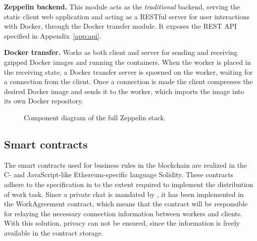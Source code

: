 \textbf{Zeppelin backend.} This module acts as the \textit{traditional} backend, serving the static client web application and acting as a RESTful server for user interactions with Docker, through the Docker transfer module. It exposes the REST API specified in Appendix~\ref{app:api}.

\textbf{Docker transfer.} Works as both client and server for sending and receiving gzipped Docker images and running the containers. When the worker is placed in the receiving state, a Docker transfer server is spawned on the worker, waiting for a connection from the client. Once a connection is made the client compresses the desired Docker image and sends it to the worker, which imports the image into its own Docker repository.

\begin{figure}[ht]
\centering
{}
\caption{Component diagram of the full Zeppelin stack.}
\label{zep-stack}
\end{figure}

\subsection{Smart contracts}
The smart contracts used for business rules in the blockchain are realized in the C- and JavaScript-like Ethereum-specific language Solidity. These contracts adhere to the specification in  to the extent required to implement the distribution of work task. Since a private chat is mandated by , it has been implemented in the WorkAgreement contract, which means that the contract will be responsible for relaying the necessary connection information between workers and clients. With this solution, privacy can not be ensured, since the information is freely available in the contract storage.

